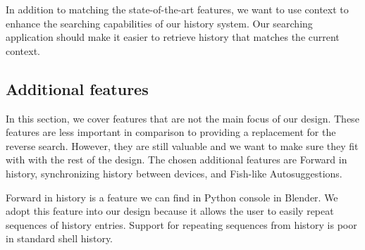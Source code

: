 

In addition to matching the state-of-the-art features, we want to use context to enhance the searching capabilities of our history system. Our searching application should make it easier to retrieve history that matches the current context. 





\subsection{Additional features}

In this section, we cover features that are not the main focus of our design. These features are less important in comparison to providing a replacement for the reverse search. However, they are still valuable and we want to make sure they fit with with the rest of the design. 
The chosen additional features are Forward in history, synchronizing history between devices, and Fish-like Autosuggestions.




Forward in history is a feature we can find in Python console in Blender. We adopt this feature into our design because it allows the user to easily repeat sequences of history entries. Support for repeating sequences from history is poor in standard shell history.


